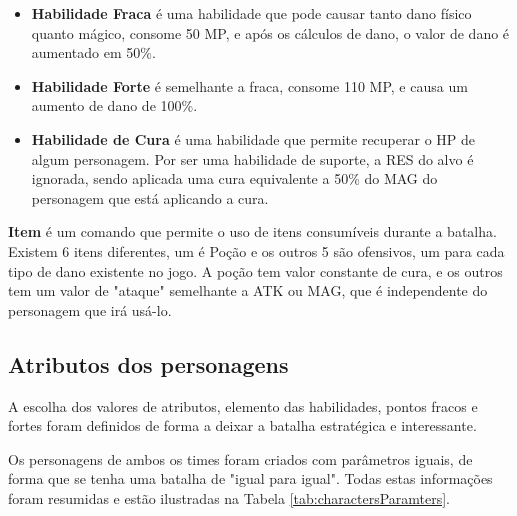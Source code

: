 \documentclass[
	12pt,					%
	openright,				%
	oneside,				%
	a4paper,				%
	bibjustif,				%
	chapter=TITLE,			%
	english,				%
	brazil,					%
	]{abntex2}
\begin{document}
	\begin{itemize}[noitemsep]
    	\item \textbf{Habilidade Fraca} é uma habilidade que pode causar tanto dano físico quanto mágico,
		consome 50 MP,
		e após os cálculos de dano,
		o valor de dano é aumentado em 50\%.
    	\item \textbf{Habilidade Forte} é semelhante a fraca,
    	consome 110 MP,
		e causa um aumento de dano de 100\%.
    	\item \textbf{Habilidade de Cura} é uma habilidade que permite recuperar o HP de algum personagem.
		Por ser uma habilidade de suporte,
		a RES do alvo é ignorada,
		sendo aplicada uma cura equivalente a 50\% do MAG do personagem que está aplicando a cura.
  	\end{itemize}
	
	\textbf{Item} é um comando que permite o uso de itens consumíveis durante a batalha.
	Existem 6 itens diferentes,
	um é Poção e os outros 5 são ofensivos, um para cada tipo de dano existente no jogo.
	A poção tem valor constante de cura,
	e os outros tem um valor de "ataque"{} semelhante a ATK ou MAG,
	que é independente do personagem que irá usá-lo.
	
	\subsection{Atributos dos personagens}
	A escolha dos valores de atributos,
	elemento das habilidades,
	pontos fracos e fortes foram definidos de forma a deixar a batalha estratégica e interessante.

	Os personagens de ambos os times foram criados com parâmetros iguais,
	de forma que se tenha uma batalha de "igual para igual"{}.
	Todas estas informações foram resumidas
	e estão ilustradas na Tabela \ref{tab:charactersParamters}.
	
\end{document}
